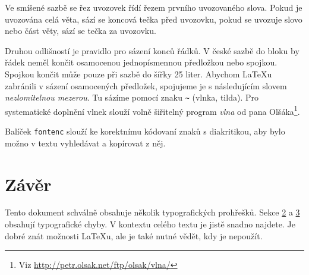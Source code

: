 \documentclass[a4paper, 10pt, twocolumn, final]{article}
\begin{document}
Ve smíšené sazbě se řez uvozovek řídí řezem prvního uvozovaného slova.
Pokud je uvozována celá věta, sází se koncová tečka před uvozovku, pokud se uvozuje slovo nebo část věty, sází se tečka za uvozovku.

Druhou odlišností je pravidlo pro sázení konců řádků.
V české sazbě do bloku by řádek neměl končit osamocenou jednopísmennou předložkou nebo spojkou.
Spojkou  končit může pouze při sazbě do šířky 25 liter.
Abychom \LaTeX u zabránili v sázení osamocených předložek, spojujeme je s následujícím slovem \emph{nezlomitelnou mezerou}.
Tu sázíme pomocí znaku \verb|~| (vlnka, tilda).
Pro systematické doplnění vlnek slouží volně šiřitelný program \emph{vlna} od pana Olšáka\footnote{Viz \href{http://petr.olsak.net/ftp/olsak/vlna/}{{\selectfont http://petr.olsak.net/ftp/olsak/vlna/}}}.

Balíček \verb|fontenc| slouží ke korektnímu kódovaní znaků s diakritikou, aby bylo možno v textu vyhledávat a kopí\-rovat z něj.


\section{Závěr}

Tento dokument schválně obsahuje několik typografických prohřešků.
Sekce \hyperlink{section.2}{2} a \hyperlink{section.3}{3} obsahují typografické chyby.
V kontextu celého textu je jistě snadno najdete.
Je dobré znát možnosti \LaTeX u, ale je také nutné vědět, kdy je nepoužít.
\end{document}
